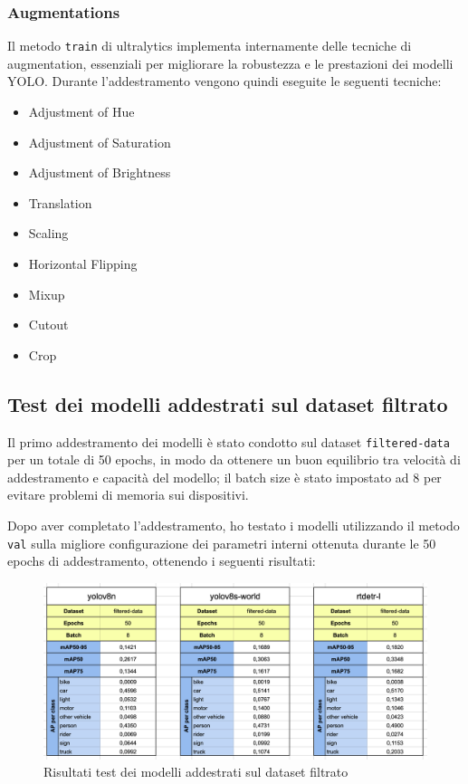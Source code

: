 \subsubsection{Augmentations}
Il metodo \texttt{train} di ultralytics implementa internamente delle tecniche di augmentation, essenziali per migliorare la robustezza e le prestazioni dei modelli YOLO. Durante l'addestramento vengono quindi eseguite le seguenti tecniche:

\begin{itemize}
    \item Adjustment of Hue
    \item Adjustment of Saturation
    \item Adjustment of Brightness
    \item Translation
    \item Scaling
    \item Horizontal Flipping
    \item Mixup
    \item Cutout
    \item Crop
\end{itemize}

\newpage

\subsection{Test dei modelli addestrati sul dataset filtrato}
Il primo addestramento dei modelli è stato condotto sul dataset \texttt{filtered-data} per un totale di 50 epochs, in modo da ottenere un buon equilibrio tra velocità di addestramento e capacità del modello; il batch size è stato impostato ad 8 per evitare problemi di memoria sui dispositivi.

Dopo aver completato l'addestramento, ho testato i modelli utilizzando il metodo \texttt{val} sulla migliore configurazione dei parametri interni ottenuta durante le 50 epochs di addestramento, ottenendo i seguenti risultati:

\begin{figure}[ht]
    \centering
    \includegraphics[width=1\textwidth]{files/capitoli/4-sperimentazione-risultati/assets/filtered-data-metrics.png}
    \caption{\label{fig:filtered-data-metrics}Risultati test dei modelli addestrati sul dataset filtrato}
\end{figure}

